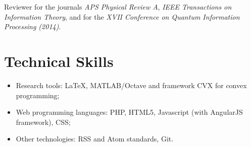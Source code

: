 \documentclass[]{article}
\begin{document}
Reviewer for the journals \emph{APS Physical Review A}, \emph{IEEE
Transactions on Information Theory}, and for the \emph{XVII Conference
on Quantum Information Processing (2014)}.

\section{Technical Skills}\label{technical-skills}

\begin{itemize}
\itemsep1pt\parskip0pt
\item
  Research tools: LaTeX, MATLAB/Octave and framework CVX for convex
  programming;
\item
  Web programming languages: PHP, HTML5, Javascript (with AngularJS
  framework), CSS;
\item
  Other technologies: RSS and Atom standards, Git.
\end{itemize}
\end{document}
